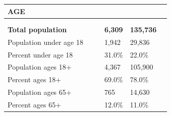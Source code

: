 \documentclass[9pt]{report}
\begin{document}
\vspace{24pt}
\setlength{\tabcolsep}{.01in} %
\begin{tabular}{p{.10in}p{.10in}p{.10in}p{3.7in}>{\hfill}p{.85in}>{\hfill}p{.85in}>{\hfill}p{.85in}>{\hfill}p{.85in}p{0.1in}}
\multicolumn{9}{l}{\parbox{7.1in}{\raggedright{\large{\strut\textbf{AGE}\strut}}}} \\ 
\hline
\multicolumn{4}{l}{\parbox{3.5in}{\raggedright{\textbf{}}}} & \multicolumn{1}{r}{\parbox{.85in}{\strut\raggedleft{\textbf{}\strut}}} & \multicolumn{1}{r}{\parbox{.85in}{\strut\raggedleft{\textbf{}\strut}}} & \multicolumn{1}{r}{\parbox{.85in}{\strut{}}} & \multicolumn{1}{r}{\parbox{.85in}{\strut{}}} & \\ 
\multicolumn{9}{l}{} \\ 
\multicolumn{4}{l}{\parbox{3.5in}{\strut\raggedright{\textbf{Total population}\strut}}} & \textbf{} & \textbf{} & \textbf{6,309} & \textbf{135,736} & \textbf{} \\ 
\multicolumn{4}{l}{\parbox{3.6in}{\strut\raggedright{{Population under age 18}}\strut}} &  &  & 1,942 & 29,836 & \multicolumn{1}{l}{}  \\ 
\multicolumn{4}{l}{\parbox{3.6in}{\strut\raggedright{{Percent under age 18}}\strut}} &  &  & 31.0\% & 22.0\% & \multicolumn{1}{l}{}  \\ 
\multicolumn{4}{l}{\parbox{3.6in}{\strut\raggedright{{Population ages 18+}}\strut}} &  &  & 4,367 & 105,900 & \multicolumn{1}{l}{}  \\ 
\multicolumn{4}{l}{\parbox{3.6in}{\strut\raggedright{{Percent ages 18+}}\strut}} &  &  & 69.0\% & 78.0\% & \multicolumn{1}{l}{}  \\ 
\multicolumn{4}{l}{\parbox{3.6in}{\strut\raggedright{{Population ages 65+}}\strut}} &  &  & 765 & 14,630 & \multicolumn{1}{l}{}  \\ 
\multicolumn{4}{l}{\parbox{3.6in}{\strut\raggedright{{Percent ages 65+}}\strut}} &  &  & 12.0\% & 11.0\% & \multicolumn{1}{l}{}  \\ 

\end{tabular}
\setlength{\tabcolsep}{6pt} %
\end{document}
